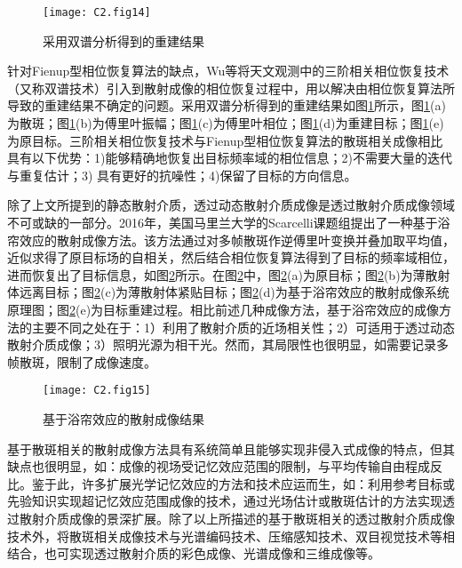 \begin{figure}[htp]
	\centering
	\texttt{[image: C2.fig14]}
	\caption{采用双谱分析得到的重建结果\cite{wu_single-shot_2016}}
	\label{fig2:14}
\end{figure}

针对Fienup型相位恢复算法的缺点，Wu等\cite{wu_single-shot_2016}将天文观测中的三阶相关相位恢复技术（又称双谱技术）引入到散射成像的相位恢复过程中，用以解决由相位恢复算法所导致的重建结果不确定的问题。采用双谱分析得到的重建结果如图\ref{fig2:14}所示，图\ref{fig2:14}(a)为散斑；图\ref{fig2:14}(b)为傅里叶振幅；图\ref{fig2:14}(c)为傅里叶相位；图\ref{fig2:14}(d)为重建目标；图\ref{fig2:14}(e)为原目标。三阶相关相位恢复技术与Fienup型相位恢复算法的散斑相关成像相比具有以下优势：1)能够精确地恢复出目标频率域的相位信息；2)不需要大量的迭代与重复估计；3) 具有更好的抗噪性；4)保留了目标的方向信息。

除了上文所提到的静态散射介质，透过动态散射介质成像是透过散射介质成像领域不可或缺的一部分\cite{edrei_optical_2016,singh_looking_2014}。2016年，美国马里兰大学的Scarcelli课题组\cite{edrei_optical_2016}提出了一种基于浴帘效应的散射成像方法。该方法通过对多帧散斑作逆傅里叶变换并叠加取平均值，近似求得了原目标场的自相关，然后结合相位恢复算法得到了目标的频率域相位，进而恢复出了目标信息，如图\ref{fig2:15}所示。在图\ref{fig2:15}中，图\ref{fig2:15}(a)为原目标；图\ref{fig2:15}(b)为薄散射体远离目标；图\ref{fig2:15}(c)为薄散射体紧贴目标；图\ref{fig2:15}(d)为基于浴帘效应的散射成像系统原理图；图\ref{fig2:15}(e)为目标重建过程。相比前述几种成像方法，基于浴帘效应的成像方法的主要不同之处在于：1）利用了散射介质的近场相关性；2）可适用于透过动态散射介质成像；3）照明光源为相干光。然而，其局限性也很明显，如需要记录多帧散斑，限制了成像速度。

\begin{figure}[htp]
	\centering
	\texttt{[image: C2.fig15]}
	\caption{基于浴帘效应的散射成像结果\cite{edrei_optical_2016}}
	\label{fig2:15}
\end{figure}

基于散斑相关的散射成像方法具有系统简单且能够实现非侵入式成像的特点，但其缺点也很明显，如：成像的视场受记忆效应范围的限制，与平均传输自由程成反比。鉴于此，许多扩展光学记忆效应的方法和技术应运而生，如：利用参考目标\cite{yang_imaging_2018}或先验知识\cite{wang_prior-information-free_2019}实现超记忆效应范围成像的技术，通过光场估计\cite{jin_depth_2018}或散斑估计\cite{liao_extending_2019}的方法实现透过散射介质成像的景深扩展。除了以上所描述的基于散斑相关的透过散射介质成像技术外，将散斑相关成像技术与光谱编码技术\cite{sahoo_single-shot_2017}、压缩感知技术\cite{candes_introduction_2008,rudin_nonlinear_1992}、双目视觉技术\cite{brady_compressive_2009,mukherjee_3d_2018}等相结合，也可实现透过散射介质的彩色成像、光谱成像和三维成像等。
